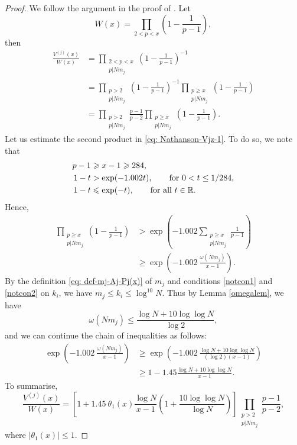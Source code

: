 \documentclass[12pt]{amsart}
\begin{document}
\begin{proof}
We follow the argument in the proof of \cite[Theorem 10.3]{Nathanson}. Let
\begin{equation*}
    W(x) = \prod_{2 < p < x} \left( 1 - \frac{1}{p-1} \right), 
\end{equation*}
then
\begin{align}
    \frac{V^{(j)}(x)}{W(x)} &= \prod_{\substack{2 < p < x \\ p | N m_j}} \left( 1 - \frac{1}{p-1} \right)^{-1} \nonumber \\
    &= \prod_{\substack{p > 2 \\ p | N m_j}} \left( 1 - \frac{1}{p-1} \right)^{-1} \prod_{\substack{p \ge x \\ p | N m_j}} \left( 1 - \frac{1}{p-1} \right) \nonumber\\
    &= \prod_{\substack{p > 2 \\ p | N m_j}} \frac{p-1}{p-2} \prod_{\substack{p \ge x \\ p | N m_j}} \left( 1 - \frac{1}{p-1} \right). \label{eq: Nathanson-Vjz-1}
\end{align}
Let us estimate the second product in \eqref{eq: Nathanson-Vjz-1}. To do so, we note that 
\begin{align}
    p - 1 &\ge x - 1 \ge 284,\notag\\
    1 - t &> \exp(-1.002 t),\qquad\text{for $0<t\leq 1/284$},\label{exp1002eq}\\
    1 - t &\le \exp(-t),\qquad\text{for all $t\in\mathbb{R}$.}\notag
\end{align}
Hence,
\begin{align*}
    \prod_{\substack{p \ge x \\ p | N m_j}} \left( 1 - \frac{1}{p-1} \right) &> \exp \left( -1.002 \sum_{\substack{p \ge x \\ p | N m_j}} \frac{1}{p-1} \right) \\
    &\ge \exp \left( -1.002~\frac{\omega(N m_j)}{x-1} \right).
\end{align*}
By the definition \eqref{eq: def-mj-Aj-Pj(x)} of $m_j$ and conditions \eqref{notcon1} and \eqref{notcon2} on $k_i$, we have ${m_j \le k_i \le \log^{10} N}$. Thus by Lemma \ref{omegalem}, we have $$\omega(N m_j) \le \frac{\log N + 10 \log \log N}{\log 2},$$ and we can continue the chain of inequalities as follows:
\begin{align*}
    \exp \left( -1.002~\frac{\omega(N m_j)}{x-1} \right) &\ge \exp \left( -1.002~\frac{\log N + 10 \log \log N}{(\log 2)(x - 1)} \right) \\
    &\ge 1 - 1.45 \frac{\log N + 10 \log \log N}{x - 1}.
\end{align*}
To summarise,
\begin{equation} \label{eq: Vj-over-W}
\frac{V^{(j)}(x)}{W(x)} = \left[ 1 + 1.45~\theta_1(x) \frac{\log N}{x-1} \left( 1 + \frac{10 \log \log N}{\log N} \right) \right] \prod_{\substack{p > 2 \\ p | N m_j}} \frac{p-1}{p-2},
\end{equation}
where $|\theta_1(x)| \le 1$.


\end{proof}
\end{document}
